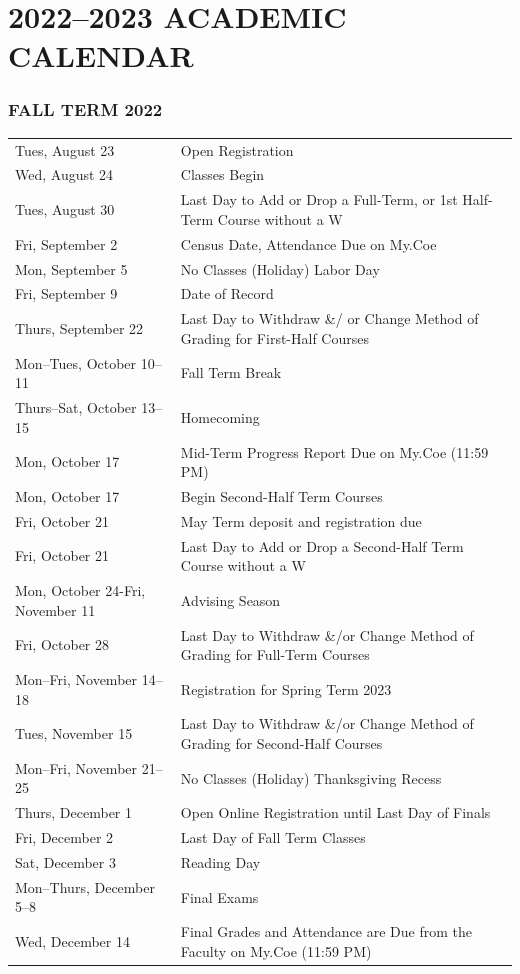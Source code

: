 \documentclass[
  letterpaper,
]{scrbook}
\renewcommand\toprule[2]\relax
\renewcommand\bottomrule[2]\relax
\begin{document}
\hypertarget{academic-calendar}{%
\chapter{2022--2023 ACADEMIC CALENDAR}\label{academic-calendar}}

\hypertarget{fall-term-2022}{%
\subsection{FALL TERM 2022}\label{fall-term-2022}}

\begin{longtable}[]{@{}
  >{\raggedright\arraybackslash}p{}
  >{\raggedleft\arraybackslash}p{}@{}}
\toprule\noalign{}
\endhead
\bottomrule\noalign{}
\endlastfoot
Tues, August 23 & Open Registration \\
Wed, August 24 & Classes Begin \\
Tues, August 30 & Last Day to Add or Drop a Full-Term, or 1st Half-Term
Course without a W \\
Fri, September 2 & Census Date, Attendance Due on My.Coe \\
Mon, September 5 & No Classes (Holiday) Labor Day \\
Fri, September 9 & Date of Record \\
Thurs, September 22 & Last Day to Withdraw \&/ or Change Method of
Grading for First-Half Courses \\
Mon--Tues, October 10--11 & Fall Term Break \\
Thurs--Sat, October 13--15 & Homecoming \\
Mon, October 17 & Mid-Term Progress Report Due on My.Coe (11:59 PM) \\
Mon, October 17 & Begin Second-Half Term Courses \\
Fri, October 21 & May Term deposit and registration due \\
Fri, October 21 & Last Day to Add or Drop a Second-Half Term Course
without a W \\
Mon, October 24-Fri, November 11 & Advising Season \\
Fri, October 28 & Last Day to Withdraw \&/or Change Method of Grading
for Full-Term Courses \\
Mon--Fri, November 14--18 & Registration for Spring Term 2023 \\
Tues, November 15 & Last Day to Withdraw \&/or Change Method of Grading
for Second-Half Courses \\
Mon--Fri, November 21--25 & No Classes (Holiday) Thanksgiving Recess \\
Thurs, December 1 & Open Online Registration until Last Day of Finals \\
Fri, December 2 & Last Day of Fall Term Classes \\
Sat, December 3 & Reading Day \\
Mon--Thurs, December 5--8 & Final Exams \\
Wed, December 14 & Final Grades and Attendance are Due from the Faculty
on My.Coe (11:59 PM) \\
\end{longtable}
\end{document}
